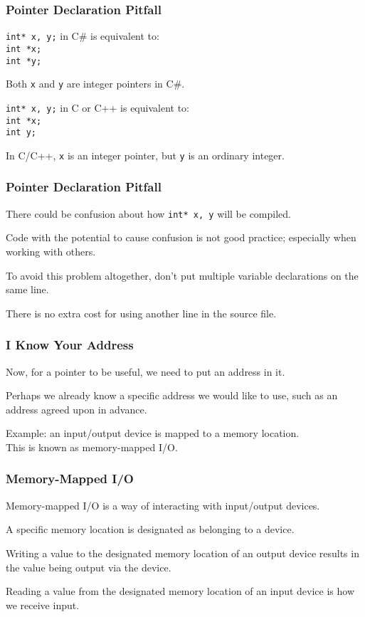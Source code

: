 \begin{frame}
\frametitle{Pointer Declaration Pitfall}
\texttt{int* x, y;} in C\# is equivalent to:\\
\quad \texttt{int *x;} \\
\quad \texttt{int *y;}

Both \texttt{x} and \texttt{y} are integer pointers in C\#.

\texttt{int* x, y;} in C or C++ is equivalent to:\\
\quad \texttt{int *x;}\\
\quad \texttt{int y;}

In C/C++, \texttt{x} is an integer pointer, but \texttt{y} is an ordinary integer.\\

\end{frame}

\begin{frame}
\frametitle{Pointer Declaration Pitfall}
There could be confusion about how \texttt{int* x, y} will be compiled.


Code with the potential to cause confusion is not good practice; especially when working with others.


To avoid this problem altogether, don't put multiple variable declarations on the same line.

There is no extra cost for using another line in the source file.

\end{frame}

\begin{frame}
\frametitle{I Know Your Address}
Now, for a pointer to be useful, we need to put an address in it.

Perhaps we already know a specific address we would like to use, such as an address agreed upon in advance.

Example: an input/output device is mapped to a memory location.\\
\quad This is known as \alert{memory-mapped I/O}.

\end{frame}

\begin{frame}
\frametitle{Memory-Mapped I/O}
Memory-mapped I/O is a way of interacting with input/output devices.

A specific memory location is designated as belonging to a device. 

Writing a value to the designated memory location of an output device results in the value being output via the device.

Reading a value from the designated memory location of an input device is how we receive input.

\end{frame}



